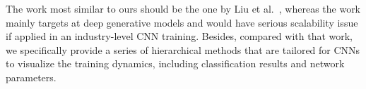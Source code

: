 \documentclass[format=acmsmall, review=false, screen=true]{acmart}
\newcommand{\ti}{\textcolor[rgb]{0,0,0}}
\newcommand{\td}{\textcolor[rgb]{0,0,0}}
\begin{document}
\ti{The work most similar to ours should be the one by Liu et al.~\cite{liu2018analyzing}, whereas the work mainly targets at deep generative models and would have serious scalability issue if applied in an industry-level CNN training. Besides, compared with that work, we specifically provide a series of hierarchical methods that are tailored for CNNs to visualize the training dynamics, including classification results and network parameters.
}%
\end{document}
